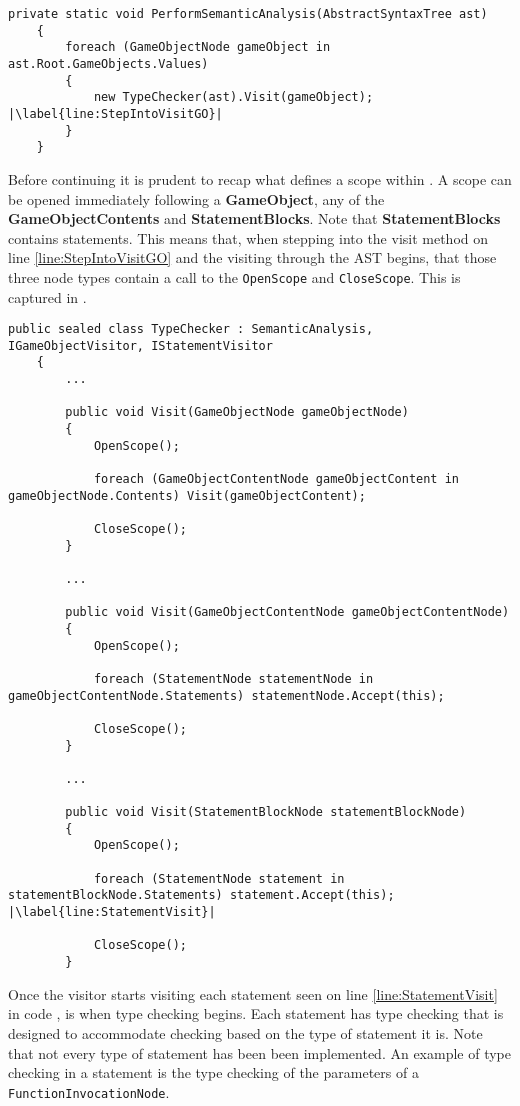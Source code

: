 \begin{lstlisting}[caption={Typechecker object for every gameObject}, label={lst:TypeCheckEachGO},escapechar=|]
    private static void PerformSemanticAnalysis(AbstractSyntaxTree ast)
    {
        foreach (GameObjectNode gameObject in ast.Root.GameObjects.Values)
        {
            new TypeChecker(ast).Visit(gameObject); |\label{line:StepIntoVisitGO}|
        }
    }
\end{lstlisting}

Before continuing it is prudent to recap what defines a scope within \dazel{}. A scope can be opened immediately following a \textbf{GameObject}, any of the \textbf{GameObjectContents} and \textbf{StatementBlocks}. Note that \textbf{StatementBlocks} contains statements. 
This means that, when stepping into the visit method on line \ref{line:StepIntoVisitGO} and the visiting through the AST begins, that those three node types contain a call to the \texttt{OpenScope} and \texttt{CloseScope}. This is captured in .

\begin{lstlisting}[caption={Applying Scope to GameObjects, GameObjectContents and StatementBlocks}, label={lst:ApplyScope},escapechar=|]
    public sealed class TypeChecker : SemanticAnalysis, IGameObjectVisitor, IStatementVisitor
    {
        ...

        public void Visit(GameObjectNode gameObjectNode)
        {
            OpenScope();

            foreach (GameObjectContentNode gameObjectContent in gameObjectNode.Contents) Visit(gameObjectContent);

            CloseScope();
        }

        ...

        public void Visit(GameObjectContentNode gameObjectContentNode)
        {
            OpenScope();

            foreach (StatementNode statementNode in gameObjectContentNode.Statements) statementNode.Accept(this);

            CloseScope();
        }

        ... 

        public void Visit(StatementBlockNode statementBlockNode)
        {
            OpenScope();

            foreach (StatementNode statement in statementBlockNode.Statements) statement.Accept(this); |\label{line:StatementVisit}|

            CloseScope();
        }
\end{lstlisting}

Once the visitor starts visiting each statement seen on line \ref{line:StatementVisit} in code , is when type checking begins. Each statement has type checking that is designed to accommodate checking based on the type of statement it is. Note that not every type of statement has been been implemented.
An example of type checking in a statement is the type checking of the parameters of a \texttt{FunctionInvocationNode}. 